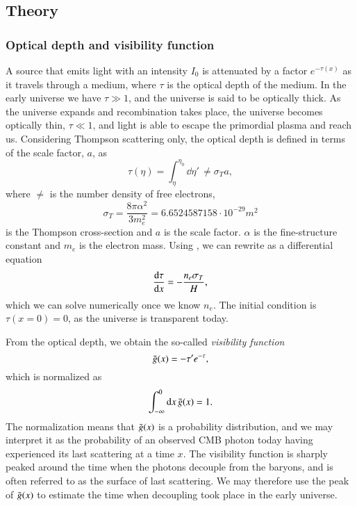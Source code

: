 

\subsection{Theory}\label{ssec:M2:theory}

\subsubsection{Optical depth and visibility function} \label{sssec:M2:optical_depth_and_visibility_function}

A source that emits light with an intensity $I_0$ is attenuated by a factor $e^{-\tau(x)}$ as it travels through a medium, where $\tau$ is the optical depth of the medium. In the early universe we have $\tau\gg1$, and the universe is said to be optically thick. As the universe expands and recombination takes place, the universe becomes optically thin, $\tau\ll1$, and light is able to escape the primordial plasma and reach us. Considering Thompson scattering only, the optical depth is defined in terms of the scale factor, $a$, as \citep[Eq. (5)]{callin} 
\begin{equation} \label{eq:M2:theory:optical_depth_integral_definition}
    \tau(\eta) = \int_\eta^{\eta_0} \dd \eta' \,\ne \sigma_T a,
\end{equation}
where $\ne$ is the number density of free electrons,
\begin{equation} \label{eq:M2:theory:thomspon_cross_section}
    \sigma_T=\frac{8\pi\alpha^2}{3 m_e^2} = 6.6524587158\cdot 10^{-29}\unit{m^2} 
\end{equation}
is the Thompson cross-section and $a$ is the scale factor. $\alpha$ is the fine-structure constant and $m_e$ is the electron mass. Using , we can rewrite  as a differential equation 
\begin{equation} \label{eq:M2:theory:tau_ODE}
    \dv{\tau}{x} = - \frac{n_e \sigma_T}{H},
\end{equation}
which we can solve numerically once we know $n_e$. The initial condition is $\tau(x=0)=0$, as the universe is transparent today.

From the optical depth, we obtain the so-called \textit{visibility function} \cite[Eq. (8)]{callin} 
\begin{equation} \label{eq:M2:theory:g_tilde_of_x_definition}
    \tilde{g}(x) = -\tau' e^{-\tau},
\end{equation}
which is normalized as 
\begin{equation} \label{eq:M2:theory:g_tilde_normalization}
    \int_{-\infty}^0\dd x\,\tilde{g}(x) = 1.
\end{equation}
The normalization means that $\tilde{g}(x)$ is a probability distribution, and we may interpret it as the probability of an observed CMB photon today having experienced its last scattering at a time $x$. The visibility function is sharply peaked around the time when the photons decouple from the baryons, and is often referred to as the surface of last scattering. We may therefore use the peak of $\tilde{g}(x)$ to estimate the time when decoupling took place in the early universe. 

